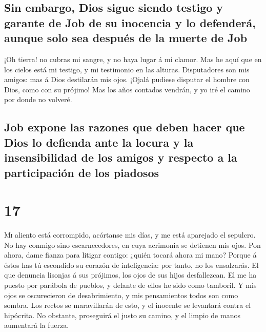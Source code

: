 \hypertarget{sin-embargo-dios-sigue-siendo-testigo-y-garante-de-job-de-su-inocencia-y-lo-defenderuxe1-aunque-solo-sea-despuuxe9s-de-la-muerte-de-job}{%
\subsection{Sin embargo, Dios sigue siendo testigo y garante de Job de
su inocencia y lo defenderá, aunque solo sea después de la muerte de
Job}\label{sin-embargo-dios-sigue-siendo-testigo-y-garante-de-job-de-su-inocencia-y-lo-defenderuxe1-aunque-solo-sea-despuuxe9s-de-la-muerte-de-job}}

 ¡Oh tierra! no cubras mi sangre, y no haya lugar á mi
clamor.  Mas he aquí que en los cielos está mi testigo, y
mi testimonio en las alturas.  Disputadores son mis
amigos: mas á Dios destilarán mis ojos.  ¡Ojalá pudiese
disputar el hombre con Dios, como con su prójimo!  Mas
los años contados vendrán, y yo iré el camino por donde no volveré.

\hypertarget{job-expone-las-razones-que-deben-hacer-que-dios-lo-defienda-ante-la-locura-y-la-insensibilidad-de-los-amigos-y-respecto-a-la-participaciuxf3n-de-los-piadosos}{%
\subsection{Job expone las razones que deben hacer que Dios lo defienda
ante la locura y la insensibilidad de los amigos y respecto a la
participación de los
piadosos}\label{job-expone-las-razones-que-deben-hacer-que-dios-lo-defienda-ante-la-locura-y-la-insensibilidad-de-los-amigos-y-respecto-a-la-participaciuxf3n-de-los-piadosos}}

\hypertarget{section-18-17}{%
\section{17}\label{section-18-17}}

 \textsc{Mi} aliento está corrompido, acórtanse mis días,
y me está aparejado el sepulcro.  No hay conmigo sino
escarnecedores, en cuya acrimonia se detienen mis ojos. 
Pon ahora, dame fianza para litigar contigo: ¿quién tocará ahora mi
mano?  Porque á éstos has tú escondido su corazón de
inteligencia: por tanto, no los ensalzarás.  El que
denuncia lisonjas á sus prójimos, los ojos de sus hijos desfallezcan.
 El me ha puesto por parábola de pueblos, y delante de
ellos he sido como tamboril.  Y mis ojos se oscurecieron
de desabrimiento, y mis pensamientos todos son como sombra.
 Los rectos se maravillarán de esto, y el inocente se
levantará contra el hipócrita.  No obstante, proseguirá el
justo su camino, y el limpio de manos aumentará la fuerza.

